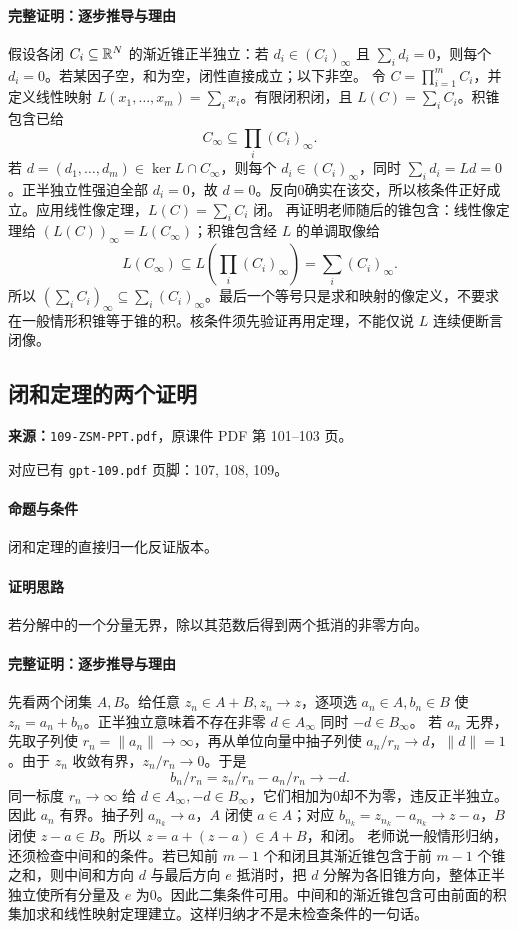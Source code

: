 \paragraph{完整证明：逐步推导与理由}

假设各闭 $C_i\subseteq\mathbb{R}^N$ 的渐近锥正半独立：若 $d_i\in(C_i)_\infty$ 且 $\sum_i d_i=0$，则每个 $d_i=0$。若某因子空，和为空，闭性直接成立；以下非空。
令 $C=\prod_{i=1}^mC_i$，并定义线性映射 $L(x_1,\ldots,x_m)=\sum_i x_i$。有限闭积闭，且 $L(C)=\sum_iC_i$。积锥包含已给
\[C_\infty\subseteq\prod_i(C_i)_\infty.\]
若 $d=(d_1,\ldots,d_m)\in\ker L\cap C_\infty$，则每个 $d_i\in(C_i)_\infty$，同时 $\sum_id_i=Ld=0$。正半独立性强迫全部 $d_i=0$，故 $d=0$。反向0确实在该交，所以核条件正好成立。应用线性像定理，$L(C)=\sum_iC_i$ 闭。
再证明老师随后的锥包含：线性像定理给 $(L(C))_\infty=L(C_\infty)$；积锥包含经 $L$ 的单调取像给
\[L(C_\infty)\subseteq L\left(\prod_i(C_i)_\infty\right)=\sum_i(C_i)_\infty.\]
所以 $(\sum_iC_i)_\infty\subseteq\sum_i(C_i)_\infty$。最后一个等号只是求和映射的像定义，不要求在一般情形积锥等于锥的积。核条件须先验证再用定理，不能仅说 $L$ 连续便断言闭像。

\clearpage\subsection{闭和定理的两个证明}
\textbf{来源：}\texttt{109-ZSM-PPT.pdf}，原课件 PDF 第 101--103 页。\par
对应已有 \texttt{gpt-109.pdf} 页脚：107, 108, 109。\par
\paragraph{命题与条件}闭和定理的直接归一化反证版本。
\paragraph{证明思路}若分解中的一个分量无界，除以其范数后得到两个抵消的非零方向。
\paragraph{完整证明：逐步推导与理由}

先看两个闭集 $A,B$。给任意 $z_n\in A+B,z_n\to z$，逐项选 $a_n\in A,b_n\in B$ 使 $z_n=a_n+b_n$。正半独立意味着不存在非零 $d\in A_\infty$ 同时 $-d\in B_\infty$。
若 $a_n$ 无界，先取子列使 $r_n=\|a_n\|\to\infty$，再从单位向量中抽子列使 $a_n/r_n\to d$，$\|d\|=1$。由于 $z_n$ 收敛有界，$z_n/r_n\to0$。于是
\[b_n/r_n=z_n/r_n-a_n/r_n\to-d.\]
同一标度 $r_n\to\infty$ 给 $d\in A_\infty,-d\in B_\infty$，它们相加为0却不为零，违反正半独立。因此 $a_n$ 有界。抽子列 $a_{n_k}\to a$，$A$ 闭使 $a\in A$；对应 $b_{n_k}=z_{n_k}-a_{n_k}\to z-a$，$B$ 闭使 $z-a\in B$。所以 $z=a+(z-a)\in A+B$，和闭。
老师说一般情形归纳，还须检查中间和的条件。若已知前 $m-1$ 个和闭且其渐近锥包含于前 $m-1$ 个锥之和，则中间和方向 $d$ 与最后方向 $e$ 抵消时，把 $d$ 分解为各旧锥方向，整体正半独立使所有分量及 $e$ 为0。因此二集条件可用。中间和的渐近锥包含可由前面的积集加求和线性映射定理建立。这样归纳才不是未检查条件的一句话。

